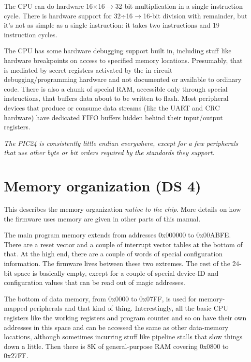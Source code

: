 The CPU can do hardware 16$\times$16$\rightarrow$32-bit multiplication in a
single instruction cycle.  There is hardware support for
32$\div$16$\rightarrow$16-bit division with remainder, but it's not as
simple as a single instruction:  it takes two
instructions and 19 instruction cycles.

The CPU has some hardware debugging support built in, including stuff like
hardware breakpoints on access to specified memory locations.  Presumably,
that is mediated by secret registers activated by the in-circuit
debugging/programming hardware and not documented or available to ordinary
code.  There is also a chunk of special RAM, accessible only through special
instructions, that buffers data about to be written to flash.  Most
peripheral devices that produce or consume data streams (like the UART and
CRC hardware) have dedicated FIFO buffers hidden behind their
input/output registers.

\emph{The PIC24 is consistently little endian everywhere, except for
a few peripherals that use other byte or bit orders required by the
standards they support.}


\section{Memory organization (DS 4)}

This describes the memory organization \emph{native to the chip}.  More
details on how the firmware uses memory are given in other parts of this
manual.

The main program memory extends from addresses 0x000000 to 0x00ABFE.  There
are a reset vector and a couple of interrupt vector tables at the bottom of
that.  At the high end, there are a couple of words of special configuration
information.  The firmware lives between these two extremes.  The rest of
the 24-bit space is basically empty, except for a couple of special
device-ID and configuration values that can be read out of magic addresses.

The bottom of data memory, from 0x0000 to 0x07FF, is used for memory-mapped
peripherals and that kind of thing.  Interestingly, all the basic CPU
registers like the working registers and program counter and so on have
their own addresses in this space and can be accessed the same as other
data-memory locations, although sometimes incurring stuff like pipeline
stalls that slow things down a little.  Then there is 8K of general-purpose
RAM covering 0x0800 to 0x27FF.

